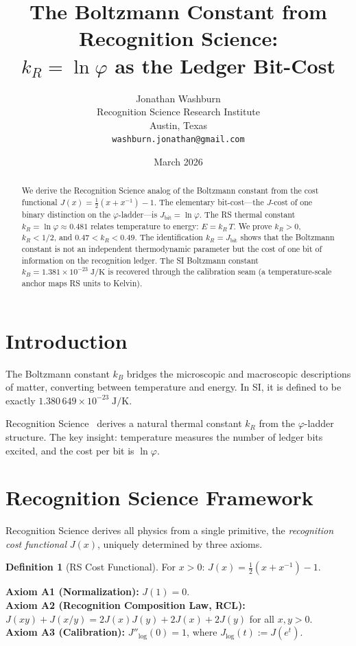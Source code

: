 \documentclass[12pt,a4paper]{article}
\title{The Boltzmann Constant from Recognition Science:\\
$k_R = \ln\varphi$ as the Ledger Bit-Cost}
\author{Jonathan Washburn\\
Recognition Science Research Institute\\
Austin, Texas\\
\texttt{washburn.jonathan@gmail.com}}
\date{March 2026}
\theoremstyle{definition}
\newtheorem{definition}[theorem]{Definition}
\theoremstyle{remark}
\begin{document}
\maketitle

\begin{abstract}
We derive the Recognition Science analog of the Boltzmann constant
from the cost functional $J(x) = \tfrac{1}{2}(x + x^{-1}) - 1$.
The elementary bit-cost---the $J$-cost of one binary distinction on
the $\varphi$-ladder---is $J_{\mathrm{bit}} = \ln\varphi$.  The RS
thermal constant $k_R = \ln\varphi \approx 0.481$ relates temperature
to energy: $E = k_R\,T$.  We prove $k_R > 0$, $k_R < 1/2$, and
$0.47 < k_R < 0.49$.  The identification $k_R = J_{\mathrm{bit}}$
shows that the Boltzmann constant is not an independent thermodynamic
parameter but the cost of one bit of information on the recognition
ledger.  The SI Boltzmann constant
$k_B = 1.381 \times 10^{-23}\;\mathrm{J/K}$ is recovered through the
calibration seam (a temperature-scale anchor maps RS units to Kelvin).
\end{abstract}

\section{Introduction}

The Boltzmann constant $k_B$ bridges the microscopic and macroscopic
descriptions of matter, converting between temperature and energy.  In
SI, it is defined to be exactly
$1.380\,649 \times 10^{-23}\;\mathrm{J/K}$.

Recognition Science~\cite{RS_Axioms} derives a natural thermal
constant $k_R$ from the $\varphi$-ladder structure.  The key insight:
temperature measures the number of ledger bits excited, and the cost
per bit is $\ln\varphi$.

\section{Recognition Science Framework}
\label{sec:framework}

Recognition Science derives all physics from a single primitive,
the \emph{recognition cost functional} $J(x)$, uniquely determined
by three axioms.

\begin{definition}[RS Cost Functional]
For $x > 0$: $J(x) = \tfrac{1}{2}(x + x^{-1}) - 1$.
\end{definition}

\noindent\textbf{Axiom A1 (Normalization):} $J(1) = 0$.\\
\textbf{Axiom A2 (Recognition Composition Law, RCL):}
$J(xy) + J(x/y) = 2J(x)J(y) + 2J(x) + 2J(y)$ for all $x, y > 0$.\\
\textbf{Axiom A3 (Calibration):} $J''_{\log}(0) = 1$, where
$J_{\log}(t) := J(e^t)$.
\end{document}
